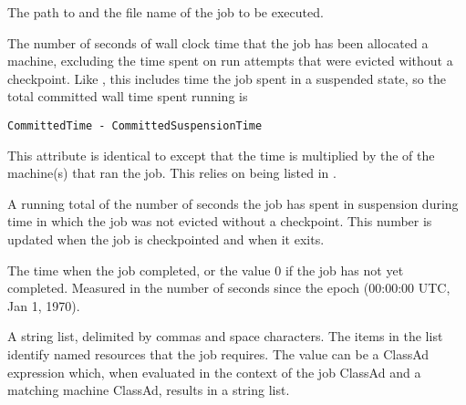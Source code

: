 \begin{description}
\item[\AdAttr{Cmd}:]  The path to and the file name of the job to be executed.

\label{CommittedTime}
\item[\AdAttr{CommittedTime}:] The number of seconds of wall clock time
that the job has been allocated a machine,
excluding the time spent on run attempts that
were evicted without a checkpoint.  
Like ,
this includes time the job spent in a suspended state,
so the total committed wall time spent running is 
\begin{verbatim}
CommittedTime - CommittedSuspensionTime
\end{verbatim}

\label{CommittedSlotTime}
\item[\AdAttr{CommittedSlotTime}:] This attribute is identical to
 except that the time is multiplied by the
 of the machine(s) that ran the job.  This relies
on  being listed in .

\item[\AdAttr{CommittedSuspensionTime}:]  A running total of the number of
seconds the job has spent in suspension during time in which the job was
not evicted without a checkpoint.  This number is updated when the job is
checkpointed and when it exits.

\item[\AdAttr{CompletionDate}:]  The time when the job completed,
or the value 0 if the job has not yet completed.
Measured in the
number of seconds since the epoch (00:00:00 UTC, Jan 1, 1970).

\item[\AdAttr{ConcurrencyLimits}:]  A string list,
delimited by commas and space characters.
The items in the list
identify named resources that the job requires.
The value can be a ClassAd expression which, when evaluated in the context
of the job ClassAd and a matching machine ClassAd, results in a string list.


\end{description}
